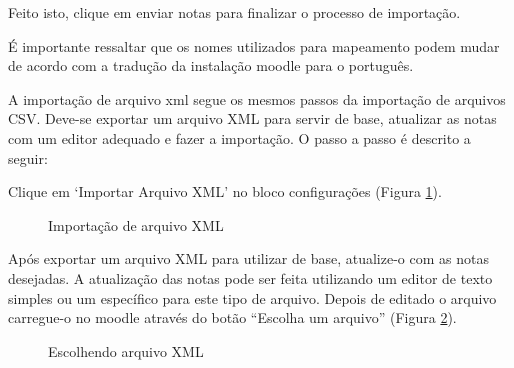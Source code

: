 Feito isto, clique em enviar notas para finalizar o processo de importação. 

É importante ressaltar que os nomes utilizados para mapeamento podem mudar de acordo com a tradução da instalação moodle para o português.

A importação de arquivo xml segue os mesmos passos da importação de arquivos CSV. Deve-se exportar um arquivo XML para servir de base, atualizar as notas com um editor adequado e fazer a importação. O passo a passo é descrito a seguir:

Clique em ‘Importar Arquivo XML’ no bloco configurações (Figura \ref{fig:cap6_41}).

\begin{figure}[!htbp]
 \begin{center}
  \caption{Importação de arquivo XML}
  \label{fig:cap6_41}
 \end{center}
\end{figure}

Após exportar um arquivo XML para utilizar de base, atualize-o com as notas desejadas. A atualização das notas pode ser feita utilizando um editor de texto simples ou um específico para este tipo de arquivo. Depois de editado o arquivo carregue-o no moodle através do botão “Escolha um arquivo” (Figura \ref{fig:cap6_42}).

\begin{figure}[!htbp]
 \begin{center}
  \caption{Escolhendo arquivo XML}
  \label{fig:cap6_42}
 \end{center}
\end{figure}


